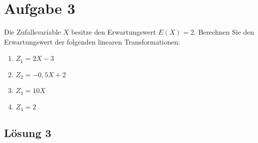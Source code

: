 \documentclass[main.tex]{subfiles}
\begin{document}
\section{Aufgabe 3}
Die Zufallsvariable $X$ besitze den Erwartungswert $E(X) = 2$. Berechnen Sie den Erwartungswert der folgenden linearen Transformationen:
\begin{enumerate}
    \item $Z_1 = 2X-3$
    \item $Z_2 = -0,5 X +2$
    \item $Z_3 = 10 X$
    \item $Z_4 = 2$
\end{enumerate}

\subsection{Lösung 3}
\end{document}
